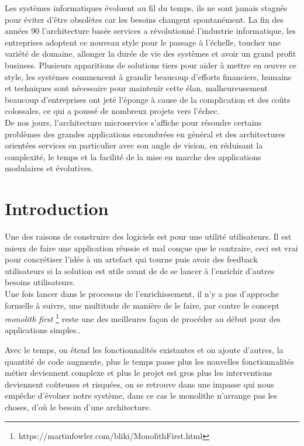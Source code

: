 \documentclass[12pt, a4paper, openany]{report}
\begin{document}
   Les systèmes informatiques évoluent au fil du temps, ils ne sont jamais stagnés pour éviter d’être obsolètes car les besoins changent spontanément. La fin des années 90 l'architecture basée services a révolutionné l'industrie informatique, les entreprises adoptent ce nouveau style pour le passage à l’échelle, toucher une variété de domaine, allonger la durée de vie des systèmes et avoir un grand profit business. Plusieurs apparitions de solutions tiers pour aider à mettre en œuvre ce style, les systèmes commencent à grandir beaucoup d'efforts financiers, humains et techniques sont nécessaire pour maintenir cette élan, malheureusement beaucoup d'entreprises ont jeté l'éponge à cause de la complication et des coûts colossales, ce qui a poussé de nombreux projets vers l’échec. \\
   
   De nos jours, l'architecture microservice s'affiche pour résoudre certains problèmes des grandes applications encombrées en général et des architectures orientées services en particulier avec son angle de vision, en réduisant la complexité, le temps et la facilité de la mise en marche des applications modulaires et évolutives.



\chapter*{Introduction}
 
  Une des raisons de construire des logiciels est pour une utilité utilisateurs. Il est mieux de faire une application réussie et mal conçue que le contraire, ceci est vrai pour concrétiser l'idée à un artefact qui tourne puis avoir des feedback utilisateurs si la solution est utile avant de de se lancer à l’enrichir d'autres besoins utilisateurs. \\
  
  Une fois lancer dans le processus de l’enrichissement, il n'y a pas d'approche formelle à suivre, une multitude de manière de le faire, par contre le concept \textit{monolith first} \footnote{https://martinfowler.com/bliki/MonolithFirst.html} reste une des meilleures façon de procéder au début pour des applications simples.\cite{refbibMonoFirst}. 
  
  Avec le temps, on étend les fonctionnalités existantes et on ajoute d'autres, la quantité de code augmente, plus le temps passe plus les nouvelles fonctionnalités métier deviennent complexe et plus le projet est gros plus les interventions deviennent coûteuses et risquées, on se retrouve dans une impasse qui nous empêche d’évoluer notre système, dans ce cas le monolithe n'arrange pas les choses, d’où le besoin d'une architecture.\\
  
\end{document}
